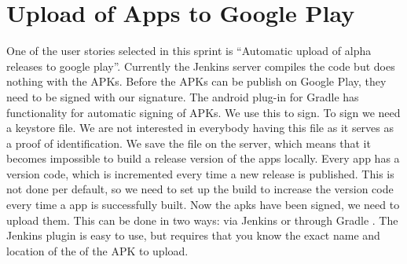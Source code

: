 \chapter{Upload of Apps to Google Play}\label{sec:upload_google_play}
One of the user stories selected in this sprint is ``Automatic upload of alpha releases to google play''. Currently the Jenkins server compiles the code but does nothing with the APKs. Before the APKs can be publish on Google Play, they need to be signed with our signature. The android plug-in for Gradle has functionality for automatic signing of APKs. We use this to sign. To sign we need a keystore file. We are not interested in everybody having this file as it serves as a proof of identification. We save the file on the server, which means that it becomes impossible to build a release version of the apps locally.
Every app has a version code, which is incremented every time a new release is published. This is not done per default, so we need to set up the build to increase the version code every time a app is successfully built. 
Now the apks have been signed, we need to upload them. This can be done in two ways: via Jenkins \parencite{jenkins-play-plugin} or through Gradle \parencite{gradle-play-plugin}. The Jenkins plugin is easy to use, but requires that you know the exact name and location of the of the APK to upload.
